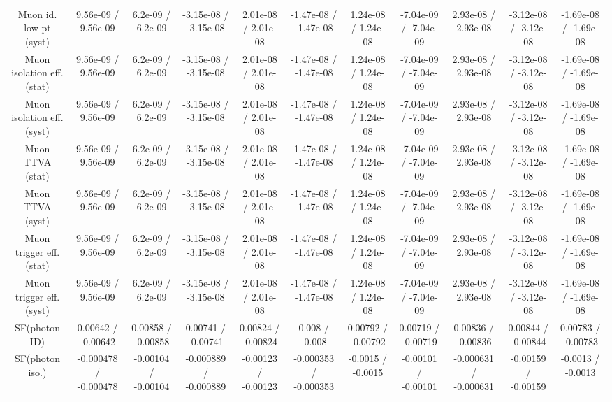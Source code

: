 \begin{table}[htbp]
\begin{center}
\begin{tabular}{|c|c|c|c|c|c|c|c|c|c|c|}
  Muon id. low pt (syst) & 9.56e-09 / 9.56e-09 & 6.2e-09 / 6.2e-09 & -3.15e-08 / -3.15e-08 & 2.01e-08 / 2.01e-08 & -1.47e-08 / -1.47e-08 & 1.24e-08 / 1.24e-08 & -7.04e-09 / -7.04e-09 & 2.93e-08 / 2.93e-08 & -3.12e-08 / -3.12e-08 & -1.69e-08 / -1.69e-08 \\ 
  Muon isolation eff. (stat) & 9.56e-09 / 9.56e-09 & 6.2e-09 / 6.2e-09 & -3.15e-08 / -3.15e-08 & 2.01e-08 / 2.01e-08 & -1.47e-08 / -1.47e-08 & 1.24e-08 / 1.24e-08 & -7.04e-09 / -7.04e-09 & 2.93e-08 / 2.93e-08 & -3.12e-08 / -3.12e-08 & -1.69e-08 / -1.69e-08 \\ 
  Muon isolation eff. (syst) & 9.56e-09 / 9.56e-09 & 6.2e-09 / 6.2e-09 & -3.15e-08 / -3.15e-08 & 2.01e-08 / 2.01e-08 & -1.47e-08 / -1.47e-08 & 1.24e-08 / 1.24e-08 & -7.04e-09 / -7.04e-09 & 2.93e-08 / 2.93e-08 & -3.12e-08 / -3.12e-08 & -1.69e-08 / -1.69e-08 \\ 
  Muon TTVA (stat) & 9.56e-09 / 9.56e-09 & 6.2e-09 / 6.2e-09 & -3.15e-08 / -3.15e-08 & 2.01e-08 / 2.01e-08 & -1.47e-08 / -1.47e-08 & 1.24e-08 / 1.24e-08 & -7.04e-09 / -7.04e-09 & 2.93e-08 / 2.93e-08 & -3.12e-08 / -3.12e-08 & -1.69e-08 / -1.69e-08 \\ 
  Muon TTVA (syst) & 9.56e-09 / 9.56e-09 & 6.2e-09 / 6.2e-09 & -3.15e-08 / -3.15e-08 & 2.01e-08 / 2.01e-08 & -1.47e-08 / -1.47e-08 & 1.24e-08 / 1.24e-08 & -7.04e-09 / -7.04e-09 & 2.93e-08 / 2.93e-08 & -3.12e-08 / -3.12e-08 & -1.69e-08 / -1.69e-08 \\ 
  Muon trigger eff. (stat) & 9.56e-09 / 9.56e-09 & 6.2e-09 / 6.2e-09 & -3.15e-08 / -3.15e-08 & 2.01e-08 / 2.01e-08 & -1.47e-08 / -1.47e-08 & 1.24e-08 / 1.24e-08 & -7.04e-09 / -7.04e-09 & 2.93e-08 / 2.93e-08 & -3.12e-08 / -3.12e-08 & -1.69e-08 / -1.69e-08 \\ 
  Muon trigger eff. (syst) & 9.56e-09 / 9.56e-09 & 6.2e-09 / 6.2e-09 & -3.15e-08 / -3.15e-08 & 2.01e-08 / 2.01e-08 & -1.47e-08 / -1.47e-08 & 1.24e-08 / 1.24e-08 & -7.04e-09 / -7.04e-09 & 2.93e-08 / 2.93e-08 & -3.12e-08 / -3.12e-08 & -1.69e-08 / -1.69e-08 \\ 
  SF(photon ID) & 0.00642 / -0.00642 & 0.00858 / -0.00858 & 0.00741 / -0.00741 & 0.00824 / -0.00824 & 0.008 / -0.008 & 0.00792 / -0.00792 & 0.00719 / -0.00719 & 0.00836 / -0.00836 & 0.00844 / -0.00844 & 0.00783 / -0.00783 \\ 
  SF(photon iso.) & -0.000478 / -0.000478 & -0.00104 / -0.00104 & -0.000889 / -0.000889 & -0.00123 / -0.00123 & -0.000353 / -0.000353 & -0.0015 / -0.0015 & -0.00101 / -0.00101 & -0.000631 / -0.000631 & -0.00159 / -0.00159 & -0.0013 / -0.0013 \\ 

\end{tabular}
\end{center}
\end{table}
